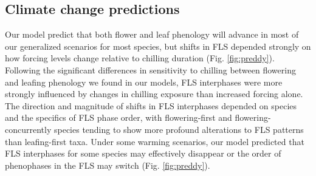 \documentclass[11pt]{article}
\begin{document}
    \subsection*{Climate change predictions}
\noindent Our model predict that both flower and leaf phenology will advance in most of our generalized scenarios for most species, but shifts in FLS depended strongly on how forcing levels change relative to chilling duration (Fig. \ref{fig:preddy}). Following the significant differences in sensitivity to chilling between flowering and leafing phenology we found in our models, FLS interphases were more strongly influenced by changes in chilling exposure than increased forcing alone. The direction and magnitude of shifts in FLS interphases depended on species and the specifics of FLS phase order, with flowering-first and flowering-concurrently species tending to show more profound alterations to FLS patterns than leafing-first taxa. Under some warming scenarios, our model predicted that  FLS interphases for some species may effectively disappear or the order of phenophases in the FLS may switch (Fig. \ref{fig:preddy}).
\end{document}
